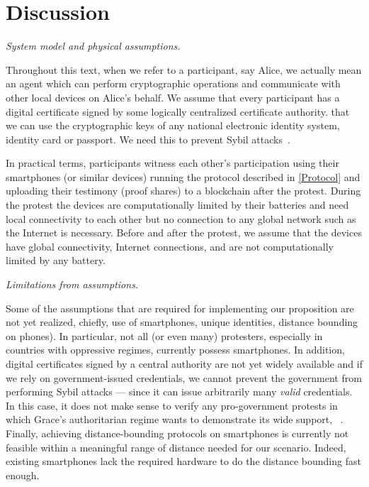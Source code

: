 \section{Discussion}%
\label{discussion}


\emph{System model and physical assumptions.}\label{assumptions}

Throughout this text, when we refer to a participant, say Alice, we actually 
mean an agent which can perform cryptographic operations and communicate with 
other local devices on Alice's behalf. We assume that every participant has a digital certificate signed by 
some logically centralized certificate authority.
\Eg that we can use the cryptographic keys of any national electronic identity 
system, identity card or passport.
We need this to prevent Sybil attacks~\cite{SybilAttack}.

In practical terms, participants witness each other's participation
using their smartphones (or similar devices) running the protocol described in
\cref{Protocol} and uploading their testimony (\ie proof shares) to a blockchain 
after the protest. During the protest the devices are computationally limited by 
their batteries and need local connectivity to each other but no connection to
any global network such as the Internet is necessary. Before and
after the protest, we assume that the devices have global connectivity, \ie 
Internet  connections, and are not computationally limited by any battery.



\emph{Limitations from assumptions.} 

Some of the assumptions that are required for implementing our
proposition are not yet realized, chiefly, use of smartphones, unique
identities, distance bounding on phones). 
In particular, not all (or even many) protesters, especially in countries with oppressive regimes, currently possess smartphones.
In addition, digital certificates signed by a central authority are not yet widely available and if we rely on government-issued credentials, we cannot prevent the government from performing Sybil attacks --- since it can issue arbitrarily many \emph{valid} credentials.
In this case, it does not make sense to verify any pro-government protests in which Grace's authoritarian regime wants to demonstrate its wide support, \eg~\cite{AlJazeeraOnVenezuela2017,VenezuelanStateWorkersCalledToParticipate}.
Finally, achieving distance-bounding protocols on smartphones is currently not feasible within a meaningful range of distance needed for our scenario.
Indeed, existing smartphones lack the required hardware to do the distance bounding fast enough.

